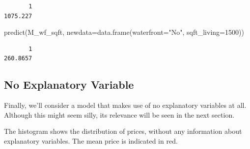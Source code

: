 \documentclass[
  letterpaper,
  DIV=11,
  numbers=noendperiod]{scrreprt}
\newenvironment{Shaded}{\begin{snugshade}}{\end{snugshade}}
\newcommand{\AttributeTok}[1]{\textcolor[rgb]{0.40,0.45,0.13}{#1}}
\newcommand{\DecValTok}[1]{\textcolor[rgb]{0.68,0.00,0.00}{#1}}
\newcommand{\FunctionTok}[1]{\textcolor[rgb]{0.28,0.35,0.67}{#1}}
\newcommand{\NormalTok}[1]{\textcolor[rgb]{0.00,0.23,0.31}{#1}}
\newcommand{\SpecialCharTok}[1]{\textcolor[rgb]{0.37,0.37,0.37}{#1}}
\newcommand{\StringTok}[1]{\textcolor[rgb]{0.13,0.47,0.30}{#1}}
\begin{document}
\begin{verbatim}
       1 
1075.227 
\end{verbatim}

\begin{Shaded}
\begin{Highlighting}[]
\FunctionTok{predict}\NormalTok{(M\_wf\_sqft, }\AttributeTok{newdata=}\FunctionTok{data.frame}\NormalTok{(}\AttributeTok{waterfront=}\StringTok{"No"}\NormalTok{, }\AttributeTok{sqft\_living=}\DecValTok{1500}\NormalTok{))}
\end{Highlighting}
\end{Shaded}

\begin{verbatim}
       1 
260.8657 
\end{verbatim}

\subsection{No Explanatory Variable}\label{no-explanatory-variable}

Finally, we'll consider a model that makes use of no explanatory
variables at all. Although this might seem silly, its relevance will be
seen in the next section.

The histogram shows the distribution of prices, without any information
about explanatory variables. The mean price is indicated in red.

\begin{Shaded}
\end{Shaded}
\end{document}
